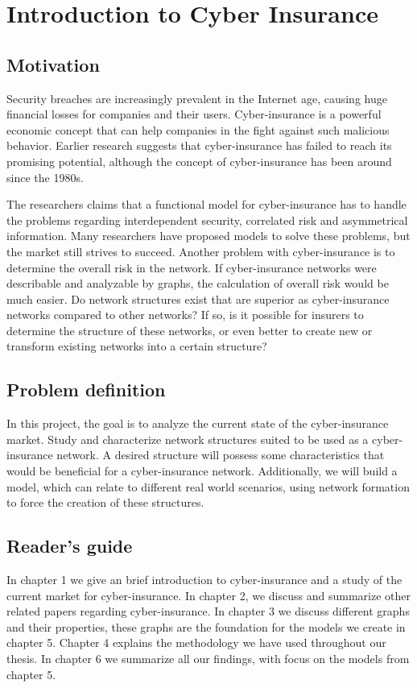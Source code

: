 \chapter{Introduction to Cyber Insurance}
\label{chp:introductionToCyberInsurance} 

\section{Motivation}
Security breaches are increasingly prevalent in the Internet age, causing huge financial losses for companies and their users. Cyber-insurance is a powerful economic concept that can help companies in the fight against such malicious behavior. Earlier research suggests that cyber-insurance has failed to reach its promising potential, although the concept of cyber-insurance has been around since the 1980s. 

The researchers claims that a functional model for cyber-insurance has to handle the problems regarding interdependent security, correlated risk and asymmetrical information. Many researchers have proposed models to solve these problems, but the market still strives to succeed. Another problem with cyber-insurance is to determine the overall risk in the network. If cyber-insurance networks were describable and analyzable by graphs, the calculation of overall risk would be much easier. Do network structures exist that are superior as cyber-insurance networks compared to other networks? If so, is it possible for insurers to determine the structure of these networks, or even better to create new or transform existing networks into a certain structure?

\section{Problem definition}
In this project, the goal is to analyze the current state of the cyber-insurance market. Study and characterize network structures suited to be used as a cyber-insurance network. A desired structure will possess some characteristics that would be beneficial for a cyber-insurance network. Additionally, we will build a model, which can relate to different real world scenarios, using network formation to force the creation of these structures. 
\section{Reader's guide}
In chapter 1 we give an brief introduction to cyber-insurance and a study of the current market for cyber-insurance. In chapter 2, we discuss and summarize other related papers regarding cyber-insurance. In chapter 3 we discuss different graphs and their properties, these graphs are the foundation for the models we create in chapter 5. Chapter 4 explains the methodology we have used throughout our thesis. In chapter 6 we summarize all our findings, with focus on the models from chapter 5. 

